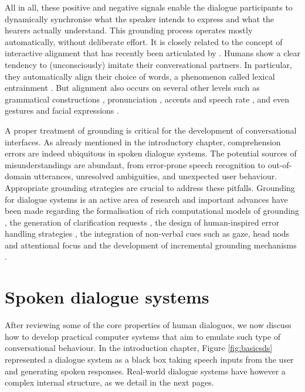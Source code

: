 All in all, these positive and negative signals enable the dialogue participants to dynamically synchronise what the speaker intends to express and what the hearers actually understand.   This grounding process operates mostly automatically, without deliberate effort.  It is closely related to the concept of interactive alignment that has recently been articulated by \cite{Garrod2004,Garrod2009}. Humans show a clear tendency to (unconsciously) imitate their conversational partners. In particular, they automatically align their choice of words, a phenomenon called lexical entrainment \citep{brennan1996conceptual}.  But alignment also occurs on several other levels such as grammatical constructions \citep{branigan2000syntactic}, pronunciation \citep{pardo2006phonetic}, accents and speech rate \citep{giles19911}, and even gestures and facial expressions \citep{bavelas1986show}.  

A proper treatment of grounding is critical for the development of conversational interfaces.  As already mentioned in the introductory chapter, comprehension errors are indeed ubiquitous in spoken dialogue systems.  The potential sources of misunderstandings are abundant, from error-prone speech recognition to out-of-domain utterances, unresolved ambiguities, and unexpected user behaviour.  Appropriate grounding strategies are crucial to address these pitfalls. Grounding for dialogue systems is an active area of research and important advances have been made regarding the formalisation of rich computational models of grounding \citep{Traum:1994thesis,MathesonPT00}, the generation of clarification requests \citep{Purver04Thesis,Rieser:2005}, the design of human-inspired error handling strategies \citep{Skantze2007}, the integration of non-verbal cues such as gaze, head nods and attentional focus \citep{Nakano:2003} and the development of incremental grounding mechanisms \citep{visser_toward_2012}.

\section{Spoken dialogue systems}
\label{sec:sds}
After reviewing some of the core properties of human dialogues, we now discuss how to develop practical computer systems that aim to emulate such type of conversational behaviour.   In the introduction chapter, Figure \ref{fig:basicsds} represented a dialogue system as a black box taking speech inputs from the user and generating spoken responses.  Real-world dialogue systems have however a complex internal structure, as we detail in the next pages.

